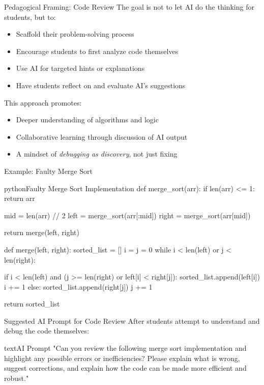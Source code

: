 \documentclass[xcolor={dvipsnames}, aspectratio=169]{beamer}
\begin{document}
\begin{frame}{Pedagogical Framing: Code Review}
  The goal is not to let AI do the thinking for students, but to:
  \begin{itemize}
    \item Scaffold their problem-solving process
    \item Encourage students to first analyze code themselves
    \item Use AI for targeted hints or explanations
    \item Have students reflect on and evaluate AI's suggestions
  \end{itemize}
  
  \begin{infobox}
    This approach promotes:
    \begin{itemize}
      \item Deeper understanding of algorithms and logic
      \item Collaborative learning through discussion of AI output
      \item A mindset of \textit{debugging as discovery}, not just fixing
    \end{itemize}
  \end{infobox}
\end{frame}

\begin{frame}[fragile]{Example: Faulty Merge Sort}
  \begin{codeboxtc}{python}{Faulty Merge Sort Implementation}{}{}
def merge_sort(arr):
    if len(arr) <= 1:
        return arr

    mid = len(arr) // 2
    left = merge_sort(arr[:mid])
    right = merge_sort(arr[mid]) 

    return merge(left, right)

def merge(left, right):
    sorted_list = []
    i = j = 0
    while i < len(left) or j < len(right):
        
        if i < len(left) and (j >= len(right) or left[i] < right[j]):
            sorted_list.append(left[i])
            i += 1
        else:
            sorted_list.append(right[j])
            j += 1

    return sorted_list
  \end{codeboxtc}
\end{frame}

\begin{frame}[fragile]{Suggested AI Prompt for Code Review}
  After students attempt to understand and debug the code themselves:
  
  \begin{codeboxtc}{text}{AI Prompt}{}{}
"Can you review the following merge sort implementation and highlight any possible errors or inefficiencies? Please explain what is wrong, suggest corrections, and explain how the code can be made more efficient and robust."
  \end{codeboxtc}
\end{frame}
\end{document}
